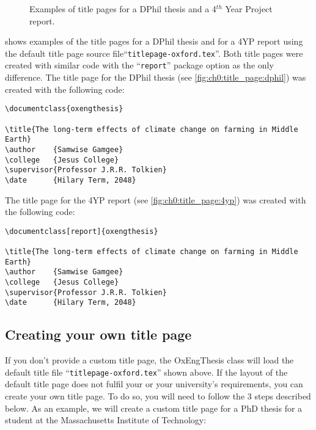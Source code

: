 \begin{figure}[htb]
    \centering
    \caption[Examples of title pages for a DPhil thesis and a 4$^{th}$ Year Project report]
    {
        Examples of title pages for a  DPhil thesis and a
         4$^{th}$ Year Project report.
        \label{fig:ch0:title_page}
    }
\end{figure}


 shows examples of the title pages for a DPhil thesis and for a 4YP report using the default title page source file``\verb|titlepage-oxford.tex|''. Both title pages were created with similar code with the ``\verb|report|'' package option as the only difference. The title page for the DPhil thesis (see \cref{fig:ch0:title_page:dphil}) was created with the following code:


\begin{lstlisting}[style=custom-latex]
\documentclass{oxengthesis}

\title{The long-term effects of climate change on farming in Middle Earth}
\author    {Samwise Gamgee}
\college   {Jesus College}
\supervisor{Professor J.R.R. Tolkien}
\date      {Hilary Term, 2048}
\end{lstlisting}


The title page for the 4YP report (see \cref{fig:ch0:title_page:4yp}) was created with the following code:


\begin{lstlisting}[style=custom-latex]
\documentclass[report]{oxengthesis}

\title{The long-term effects of climate change on farming in Middle Earth}
\author    {Samwise Gamgee}
\college   {Jesus College}
\supervisor{Professor J.R.R. Tolkien}
\date      {Hilary Term, 2048}
\end{lstlisting}


\subsection{Creating your own title page}


If you don't provide a custom title page, the OxEngThesis class will load the default title file 
``\verb|titlepage-oxford.tex|'' shown above. If the layout of the default title page does not fulfil your or your university's requirements, you can create your own title page. To do so, you will need to follow the 3 steps described below. As an example, we will create a custom title page for a
PhD thesis for a student at the Massachusetts Institute of Technology:

